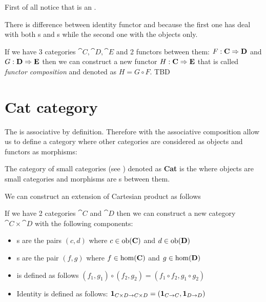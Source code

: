 \begin{remark}
  \label{rem:idfunctor}
  First of all notice that  is an
  .

  There is difference between identity functor and 
  because the first one has deal with both s and
  s while the second one with the objects
  only. 
\end{remark}

\begin{definition}
  \label{def:functor_composition}
  If we have 3 categories $\cat{C}, \cat{D}, \cat{E}$ and 2 functors
  between them: $F: \mathbf{C} \Rightarrow \mathbf{D}$ and $G: \mathbf{D} \Rightarrow \mathbf{E}$
  then we can construct a new functor $H: \mathbf{C} \Rightarrow \mathbf{E}$ that is
  called \textit{functor composition} and denoted as $H = G \circ F$.
  TBD
\end{definition}

\section{\textbf{Cat} category}
The  is associative by definition.
Therefore  with the associative composition
allow us to define a category where other categories are considered as
objects and functors as morphisms: 
\begin{definition}
  \label{def:cat_category}
  The category of small categories (see )
  denoted as \textbf{Cat} is the  where objects
  are small categories and morphisms are s
  between them.
\end{definition}

We can construct an extension of Cartesian product as follows
\begin{definition}
  \label{def:category_product}
  If we have 2 categories $\cat{C}$ and $\cat{D}$ then we can construct
  a new category $\cat{C} \times \cat{D}$ with the following components:
  \begin{itemize}
  \item {}s are the pairs $(c,d)$ where $c \in
    \mathrm{ob}(\mathbf{C})$ and $d \in \mathrm{ob}(\mathbf{D})$
  \item {}s are the pair $(f,g)$ where $f \in
    \mathrm{hom}(\mathbf{C})$ and $g \in \mathrm{hom}(\mathbf{D})$
  \item {} is defined as follows 
    \(
    (f_1, g_1) \circ (f_2, g_2) = (f_1 \circ f_2, g_1 \circ g_2)
    \)
  \item Identity is defined as follows: $\mathbf{1}_{ C \times D \to C \times D } = 
    \left(\mathbf{1}_{ C \to C }, \mathbf{1}_{ D \to D }\right)$
  \end{itemize}
\end{definition}

